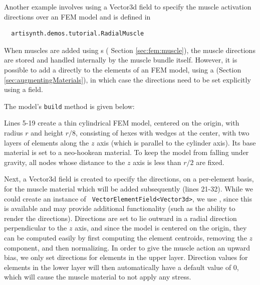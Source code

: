 Another example involves using a Vector3d field to specify the muscle
activation directions over an FEM model and is defined in
%
\begin{verbatim}
  artisynth.demos.tutorial.RadialMuscle
\end{verbatim}
%
When muscles are added using
s (
Section \ref{sec:fem:muscle}), the muscle
directions are stored and handled internally by the muscle bundle
itself. However, it is possible to add a
 directly to the
elements of an FEM model, using a
(Section \ref{sec:augmentingMaterials}), in
which case the directions need to be set explicitly using a field.

The model's {\tt build} method is given below:
\lstset{numbers=left}
\iflatexml

\else

\fi
\lstset{numbers=none}

Lines 5-19 create a thin cylindrical FEM model, centered on the
origin, with radius $r$ and height $r/8$, consisting of hexes with
wedges at the center, with two layers of elements along the $z$ axis
(which is parallel to the cylinder axis). Its base material is set to
a neo-hookean material. To keep the model from falling under gravity,
all nodes whose distance to the $z$ axis is less than $r/2$ are fixed.

Next, a Vector3d field is created to specify the directions, on a
per-element basis, for the muscle material which will be added subsequently
(lines 21-32). While we could create an instance of {\tt
VectorElementField<Vector3d>}, we use
, since this
is available and may provide additional functionality (such as the
ability to render the directions). Directions are set to lie outward
in a radial direction perpendicular to the $z$ axis, and since the
model is centered on the origin, they can be computed easily by first
computing the element centroids, removing the $z$ component, and then
normalizing. In order to give the muscle action an upward bias, we
only set directions for elements in the upper layer. Direction values
for elements in the lower layer will then automatically have a default
value of 0, which will cause the muscle material to not apply any
stress.

